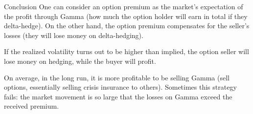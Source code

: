 \documentclass{beamer}
\begin{document}
\begin{frame}{Conclusion}
\justify
One can consider an option premium as the market's expectation of the profit through Gamma (how much the option holder will earn in total if they delta-hedge). On the other hand, the option premium compensates for the seller's losses (they will lose money on delta-hedging).

\justify
If the realized volatility turns out to be higher than implied, the option seller will lose money on hedging, while the buyer will profit.

\justify
On average, in the long run, it is more profitable to be selling Gamma (sell options, essentially selling crisis insurance to others). Sometimes this strategy fails: the market movement is so large that the losses on Gamma exceed the received premium.
\end{frame}
\end{document}

